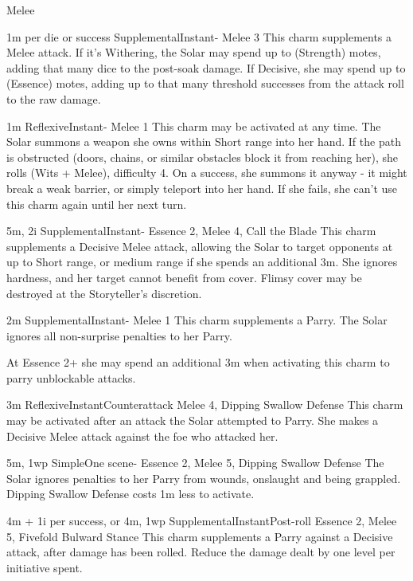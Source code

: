 \begin{Ability}{Melee}

  {1m per die or success}
  {Supplemental}{Instant}{-}
  {Melee 3}
  This charm supplements a Melee attack. If it's Withering, the Solar may spend up to (Strength) motes, adding that many dice to the post-soak damage. If Decisive, she may spend up to (Essence) motes, adding up to that many threshold successes from the attack roll to the raw damage.

  {1m}
  {Reflexive}{Instant}{-}
  {Melee 1}
  This charm may be activated at any time. The Solar summons a weapon she owns within Short range into her hand. If the path is obstructed (doors, chains, or similar obstacles block it from reaching her), she rolls (Wits + Melee), difficulty 4. On a success, she summons it anyway - it might break a weak barrier, or simply teleport into her hand. If she fails, she can't use this charm again until her next turn.

  {5m, 2i}
  {Supplemental}{Instant}{-}
  {Essence 2, Melee 4, Call the Blade}
  This charm supplements a Decisive Melee attack, allowing the Solar to target opponents at up to Short range, or medium range if she spends an additional 3m. She ignores hardness, and her target cannot benefit from cover. Flimsy cover may be destroyed at the Storyteller's discretion.

  {2m}
  {Supplemental}{Instant}{-}
  {Melee 1}
  This charm supplements a Parry. The Solar ignores all non-surprise penalties to her Parry.

  At Essence 2+ she may spend an additional 3m when activating this charm to parry unblockable attacks.

  {3m}
  {Reflexive}{Instant}{Counterattack}
  {Melee 4, Dipping Swallow Defense}
  This charm may be activated after an attack the Solar attempted to Parry. She makes a Decisive Melee attack against the foe who attacked her.

  {5m, 1wp}
  {Simple}{One scene}{-}
  {Essence 2, Melee 5, Dipping Swallow Defense}
  The Solar ignores penalties to her Parry from wounds, onslaught and being grappled. Dipping Swallow Defense costs 1m less to activate.

  {4m + 1i per success, or 4m, 1wp}
  {Supplemental}{Instant}{Post-roll}
  {Essence 2, Melee 5, Fivefold Bulward Stance}
  This charm supplements a Parry against a Decisive attack, after damage has been rolled. Reduce the damage dealt by one level per initiative spent.


\end{Ability}
